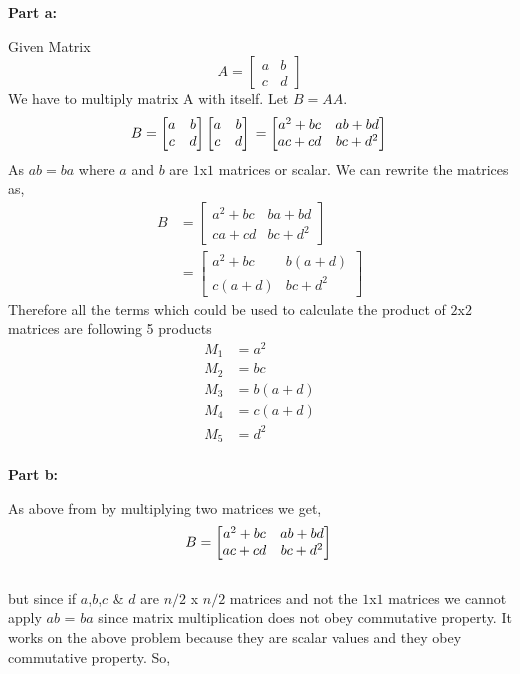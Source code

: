 \documentclass[a4paper,11pt]{article}
\theoremstyle{quest}
\newenvironment{solution}[2][Solution]{\begin{trivlist}
		\item[\hskip \labelsep {\bfseries #1}\hskip \labelsep {\bfseries #2.}]}{\end{trivlist}}
\begin{document}
\newpage
\begin{solution}2
	
	\textbf{Part a:}
	
	Given Matrix
	\begin{equation*}
		A =
		\begin{bmatrix}
		a & b \\
		c & d
	\end{bmatrix}
	\end{equation*}
	We have to multiply matrix A with itself. Let $B = AA$.
	\begin{equation*}
	B =
	\begin{bmatrix}
	a & b \\
	c & d
	\end{bmatrix}
	\begin{bmatrix}
	a & b \\
	c & d
	\end{bmatrix} \\
	= \begin{bmatrix}
	a^2+bc & ab+bd\\
	ac+cd & bc+d^2
	\end{bmatrix}\\
	\end{equation*}
	As $ ab=ba $ where $a$ and $b$ are $1$x$1$ matrices or scalar. We can rewrite the matrices as,
	\begin{align*}
	B &=
	\begin{bmatrix}
	a^2+bc & ba+bd\\
	ca+cd & bc+d^2
	\end{bmatrix}\\
	&=
	\begin{bmatrix}
	a^2+bc & b(a+d)\\
	c(a+d) & bc+d^2
	\end{bmatrix}
	\end{align*}
	Therefore all the terms which could be used to calculate the product of $2$x$2$ matrices are following 5 products
	\begin{align*}
	M_1 &= a^2 \\
	M_2 &= bc \\
	M_3 &= b(a+d) \\
	M_4 &= c(a+d) \\
	M_5 &= d^2 \\
	\end{align*}
	
	\textbf{Part b:}
	
	As above from by multiplying two matrices we get,\\
	\begin{equation*}
	B= \begin{bmatrix}
	a^2+bc & ab+bd\\
	ac+cd & bc+d^2
	\end{bmatrix}\\
	\end{equation*}\\
	but since if $a$,$b$,$c$ \& $d$ are $n/2$ x $n/2$ matrices and not the $1$x$1$ matrices we cannot apply $ab$ = $ba$ since matrix multiplication does not obey commutative property. It works on the above problem because they are scalar values and they obey commutative property. So,\\


\end{solution}
\end{document}
